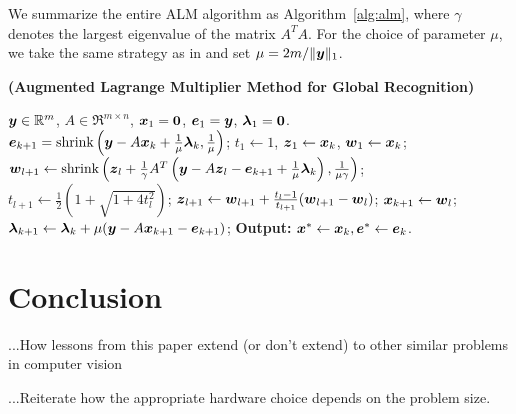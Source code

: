 \documentclass[10pt,twocolumn,letterpaper]{article}
\begin{document}
We summarize the entire ALM
algorithm as Algorithm~\ref{alg:alm}, where $\gamma$ denotes the
largest eigenvalue of the matrix $A^TA$. For the choice of parameter $\mu$, we take the same strategy as
in \cite{YangJ2009-pp} and set $\mu = 2m / \|{\boldsymbol{y}}\|_1$.
\begin{algorithm}[h]
\caption{\bf (Augmented Lagrange Multiplier Method for Global
Recognition)}
\begin{algorithmic}[1]
 ${\boldsymbol{y}} \in \mathbb R^m$, $A \in \Re^{m \times n}$,
${\boldsymbol{x}}_1 = \boldsymbol{0}$, $\boldsymbol{e}_1 = {\boldsymbol{y}}$, $\boldsymbol{\lambda}_1 =
\boldsymbol{0}$.
\STATE $\boldsymbol{e}_{k+1} = \textup{shrink}\left({\boldsymbol{y}} - A{\boldsymbol{x}}_k +
\frac{1}{\mu}\boldsymbol{\lambda}_k, \frac{1}{\mu}\right)$;
\STATE $t_1\leftarrow 1$, $\boldsymbol{z}_1 \leftarrow {\boldsymbol{x}}_k$, $\boldsymbol{w}_1 \leftarrow {\boldsymbol{x}}_k$;
\STATE $\boldsymbol{w}_{l+1} \leftarrow \textup{shrink}\left(\boldsymbol{z}_l +
\frac{1}{\gamma}A^T\left({\boldsymbol{y}} - A\boldsymbol{z}_l - \boldsymbol{e}_{k+1} +
\frac{1}{\mu}\boldsymbol{\lambda}_k\right), \frac{1}{\mu\gamma}\right)$;
\STATE $t_{l+1} \leftarrow \frac{1}{2}\left( 1 +
\sqrt{1+4t_l^2}\right)$;
\STATE $\boldsymbol{z}_{l+1} \leftarrow \boldsymbol{w}_{l+1} + \frac{t_l - 1}{t_{l+1}}(\boldsymbol{w}_{l+1} - \boldsymbol{w}_l)$;
\ENDWHILE
\STATE ${\boldsymbol{x}}_{k+1} \leftarrow \boldsymbol{w}_{l}$;
\STATE $\boldsymbol{\lambda}_{k+1} \leftarrow \boldsymbol{\lambda}_k + \mu ({\boldsymbol{y}} - A{\boldsymbol{x}}_{k+1} - \boldsymbol{e}_{k+1})$;
\ENDWHILE \STATE
{\bf Output:} ${\boldsymbol{x}}^* \leftarrow {\boldsymbol{x}}_k, \boldsymbol{e}^* \leftarrow \boldsymbol{e}_k$.
\end{algorithmic}
\label{alg:alm}
\end{algorithm}



\section{Conclusion}
...How lessons from this paper extend (or don't extend) to other similar problems in computer vision

...Reiterate how the appropriate hardware choice depends on the problem size.

{\small


}
\end{document}
